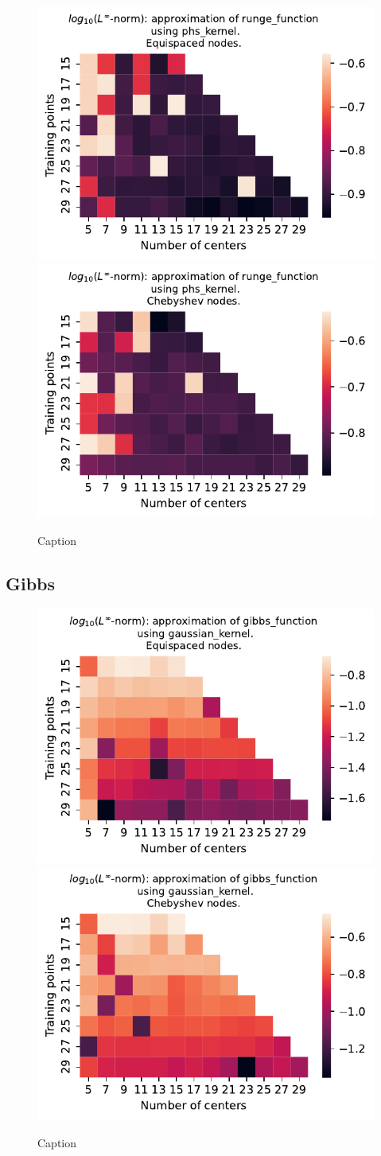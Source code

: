 \documentclass[12pt]{report} %
\begin{document}
\begin{figure}[ht]
  \centering

  \includegraphics[width=.49\textwidth]{imagenes/experiments/1d/variational/runge_function-Kphs_kernel-Equi.pdf}
  \includegraphics[width=.49\textwidth]{imagenes/experiments/1d/variational/runge_function-Kphs_kernel-Cheb.pdf}
  \caption{Caption}
  \label{fig:runge-phs}
\end{figure}


\subsection*{Gibbs}

\begin{figure}[ht]
  \centering

  \includegraphics[width=.49\textwidth]{imagenes/experiments/1d/variational/gibbs_function-Kgaussian_kernel-Equi.pdf}
  \includegraphics[width=.49\textwidth]{imagenes/experiments/1d/variational/gibbs_function-Kgaussian_kernel-Cheb.pdf}
  \caption{Caption}
  \label{fig:gibbs-gaussian}
\end{figure}
\end{document}
